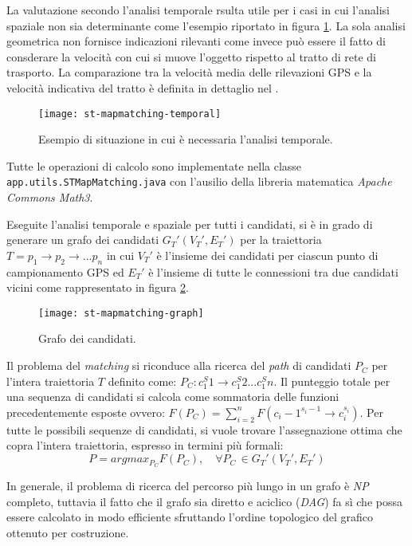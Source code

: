 La valutazione secondo l'analisi temporale rsulta utile per i casi in cui l'analisi spaziale non sia determinante come l'esempio riportato in figura \ref{fig:st-mapmatching-temporal}. La sola analisi geometrica non fornisce indicazioni rilevanti come invece può essere il fatto di consderare la velocità con cui si muove l'oggetto rispetto al tratto di rete di trasporto. La comparazione tra la velocità media delle rilevazioni GPS e la velocità indicativa del tratto è definita in dettaglio nel \cite[paragrafo 5.3]{stmapmatching}.
\begin{figure}[h]
  \centering
  \texttt{[image: st-mapmatching-temporal]}
  \caption{\footnotesize{Esempio di situazione in cui è necessaria l'analisi temporale.}}
  \label{fig:st-mapmatching-temporal}
\end{figure}

Tutte le operazioni di calcolo sono implementate nella classe \texttt{app.\-utils.\-STMapMatching.java} con l'ausilio della libreria matematica \emph{Apache Commons Math3}.

Eseguite l'analisi temporale e spaziale per tutti i candidati, si è in grado di generare un grafo dei candidati $G_T'(V_T', E_T')$ per la traiettoria $T=p_1 \rightarrow p_2 \rightarrow ... p_n$ in cui $V_T'$ è l'insieme dei candidati per ciascun punto di campionamento GPS ed $E_T'$ è l'insieme di tutte le connessioni tra due candidati vicini come rappresentato in figura \ref{fig:st-mapmatching-graph}.
\begin{figure}[h]
  \centering
  \texttt{[image: st-mapmatching-graph]}
  \caption{\footnotesize{Grafo dei candidati.}}
  \label{fig:st-mapmatching-graph}
\end{figure}

Il problema del \emph{matching} si riconduce alla ricerca del \emph{path} di candidati $P_C$ per l'intera traiettoria $T$ definito come: $P_C: c_1^S1 \rightarrow c_1^S2 ... c_1^Sn$. Il punteggio totale per una sequenza di candidati si calcola come sommatoria delle funzioni precedentemente esposte ovvero: $F(P_C)=\sum_{i=2}^{n} F(c_i-1^{s_i-1} \rightarrow c_i^{s_i})$. Per tutte le possibili sequenze di candidati, si vuole trovare l'assegnazione ottima che copra l'intera traiettoria, espresso in termini più formali:
$$P=arg max_{P_C} F(P_C), \quad \forall P_C \, \in G_T'(V_T', E_T')$$

In generale, il problema di ricerca del percorso più lungo in un grafo è \emph{NP} completo, tuttavia il fatto che il grafo sia diretto e aciclico (\emph{DAG}) fa sì che possa essere calcolato in modo efficiente sfruttando l'ordine topologico del grafico ottenuto per costruzione.


